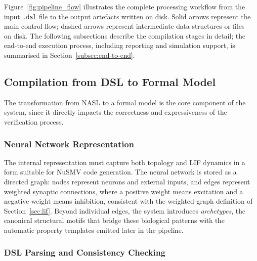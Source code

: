 \documentclass[
]{ceurart}
\begin{document}
Figure~\ref{fig:pipeline_flow} illustrates the complete processing workflow
from the input \texttt{.dsl} file to the output artefacts written on disk.
Solid arrows represent the main control flow; dashed arrows represent
intermediate data structures or files on disk. The following subsections
describe the compilation stages in detail; the end-to-end execution
process, including reporting and simulation support, is summarised in
Section~\ref{subsec:end-to-end}.



\subsection{Compilation from DSL to Formal Model}
\label{sec:compilation}

The transformation from \textsc{NASL} to a formal model is the core
component of the system, since it directly impacts the correctness and
expressiveness of the verification process.

\subsubsection{Neural Network Representation}

The internal representation must capture both topology and LIF dynamics in
a form suitable for NuSMV code generation. The neural network is stored as
a directed graph: nodes represent neurons and external inputs, and edges
represent weighted synaptic connections, where a positive weight means
excitation and a negative weight means inhibition, consistent with the
weighted-graph definition of Section~\ref{sec:lif}. Beyond individual
edges, the system introduces \emph{archetypes}, the canonical structural
motifs that bridge these biological patterns with the automatic property
templates emitted later in the pipeline.

\subsubsection{DSL Parsing and Consistency Checking}
\end{document}
